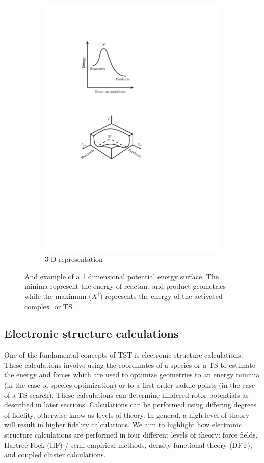 \documentclass[preprint, 11pt]{elsarticle} %
\begin{document}
\begin{figure}[htbp]
\begin{subfigure}[t]{.5\textwidth}
  \includegraphics{TST-3D-PES.pdf}
  \caption{3-D representation}
  \label{fig:sub2}
\end{subfigure}
\caption{And example of a 1 dimensional potential energy surface. The minima represent the energy of reactant and product geometries while the maximum ($X^\ddagger$) represents the energy of the activated complex, or TS.}
\label{fig:pes}
\end{figure}


\subsection{Electronic structure calculations}

One of the fundamental concepts of TST is electronic structure calculations.
These calculations involve using the coordinates of a species or a TS to estimate the energy and forces \cite{simons:2003} which are used to optimize geometries to an energy minima (in the case of species optimization) or to a first order saddle points (in the case of a TS search).
These calculations can determine hindered rotor potentials as described in later sections. 
Calculations can be performed using differing degrees of fidelity, otherwise know as levels of theory. 
In general, a high level of theory will result in higher fidelity calculations.
We aim to highlight how electronic structure calculations are performed in four different levels of theory: force fields, Hartree-Fock (HF) / semi-empirical methods, density functional theory (DFT), and coupled cluster calculations. 
\end{document}
